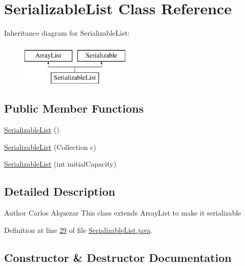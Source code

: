 \hypertarget{classdata_1_1_serializable_list}{}\section{Serializable\+List Class Reference}
\label{classdata_1_1_serializable_list}
Inheritance diagram for Serializable\+List\+:\begin{figure}[H]
\begin{center}
\leavevmode
\includegraphics[height=2.000000cm]{classdata_1_1_serializable_list}
\end{center}
\end{figure}
\subsection*{Public Member Functions}
\begin{DoxyCompactItemize}
\item 
\hyperlink{classdata_1_1_serializable_list_acd84de737b5a34dc1f239e6b95ae0dc8}{Serializable\+List} ()
\item 
\hyperlink{classdata_1_1_serializable_list_ad709ead5deacaba5d351ce90f5379e6e}{Serializable\+List} (Collection c)
\item 
\hyperlink{classdata_1_1_serializable_list_a3e055eba65ba1ec82ff42691f7a4b4d4}{Serializable\+List} (int initial\+Capacity)
\end{DoxyCompactItemize}


\subsection{Detailed Description}
\begin{DoxyAuthor}{Author}
Carlos Alquezar This class extends Array\+List to make it serializable 
\end{DoxyAuthor}


Definition at line \hyperlink{_serializable_list_8java_source_l00029}{29} of file \hyperlink{_serializable_list_8java_source}{Serializable\+List.\+java}.



\subsection{Constructor \& Destructor Documentation}
\hypertarget{classdata_1_1_serializable_list_acd84de737b5a34dc1f239e6b95ae0dc8}{}\label{classdata_1_1_serializable_list_acd84de737b5a34dc1f239e6b95ae0dc8} 
